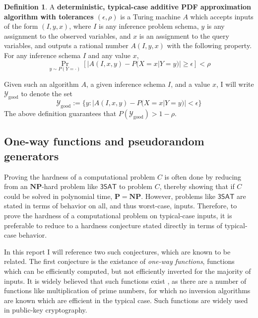 \documentclass{article}
\renewcommand{\P}{\mathbf{P}}
\newcommand{\NP}{\mathbf{NP}}
\def \Ygood{\mathcal{Y}_\text{good}}
\theoremstyle{definition}
\newtheorem{defn}{Definition}
\theoremstyle{remark}
\begin{document}
\begin{defn} \label{def:typical_case_add_alg}
A \textbf{deterministic, typical-case additive PDF approximation algorithm with tolerances $(\epsilon, \rho)$} is a Turing machine $A$ which accepts inputs of the form
$(I, y, x)$, where $I$ is any inference problem schema, $y$ is any assignment to the observed variables, and $x$ is an assignment to the query variables, and outputs a rational number $A(I, y, x)$ with the following property.
For any inference schema $I$ and any value $x$,
$$
\Pr_{y \sim P(Y = \cdot)}[|A(I, x, y) - P(X = x | Y = y)| \geq \epsilon] < \rho
$$
\end{defn}
Given such an algorithm $A$, a given inference schema $I$, and a value $x$, I will write $\Ygood$ to denote the set
$$
\Ygood := \{y : |A(I, x, y) - P(X = x | Y = y)| < \epsilon\}
$$
The above definition guarantees that $P(\Ygood) > 1 - \rho$.

\subsection{One-way functions and pseudorandom generators}
Proving the hardness of a computational problem $C$ is often done by reducing from an $\NP$-hard problem like $\mathsf{3SAT}$ to problem $C$, thereby showing that if $C$ could be solved in polynomial time, $\P = \NP$.
However, problems like $\mathsf{3SAT}$ are stated in terms of behavior on all, and thus worst-case, inputs.
Therefore, to prove the hardness of a computational problem on typical-case inputs, it is preferable to reduce to a hardness conjecture stated directly in terms of typical-case behavior.

In this report I will reference two such conjectures, which are known to be related.
The first conjecture is the existance of \textit{one-way functions}, functions which can be efficiently computed, but not efficiently inverted for the majority of inputs.
It is widely believed that such functions exist \cite{}, as there are a number of functions like multiplication of prime numbers, for which no inversion algorithms are known which are efficient in the typical case.
Such functions are widely used in public-key cryptography.
\end{document}
